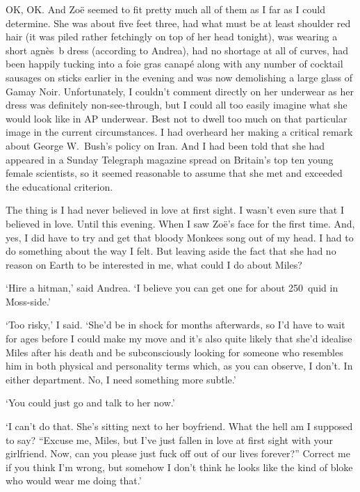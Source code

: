 OK, OK. And Zo{\"e} seemed to fit pretty much all of them as I far
as I could determine. She was about five feet three, had what must be at least shoulder red
hair (it was piled rather fetchingly on top of her head tonight), was
wearing a short agn{\`e}s~b dress (according to Andrea), had no shortage at all of curves,
had been happily tucking into a foie gras canap{\'e} along with any
number of cocktail sausages on sticks earlier in the evening and was
now demolishing a large glass of Gamay Noir. Unfortunately,
I couldn't comment directly on her underwear as her dress was
definitely non-see-through, but I could all too easily imagine what
she would look like in AP underwear. Best not to dwell too much on
that particular image in the current circumstances. I had
overheard her making a critical remark about George W.~Bush's policy
on Iran. And I had been told that she had appeared in a {\twelvesl
Sunday Telegraph\/} magazine spread on Britain's top ten young
female scientists, so it seemed reasonable to assume that she met
and exceeded the educational criterion.

The thing is I had never believed in love at first sight. I wasn't
even sure that I believed in love. Until this evening. When I saw
Zo{\"e}'s face for the first time. And, yes, I did have to try and
get that bloody Monkees song out of my head. I had to do
something about the way I felt. But leaving aside the fact that she had no reason on Earth to be
interested in me, what could I do about Miles?

`Hire a hitman,' said Andrea. `I believe you can get one for about
250~quid in Moss-side.'

`Too risky,' I said. `She'd be in shock for months afterwards, so
I'd have to wait for ages before I could make my move and it's also
quite likely that she'd idealise Miles after his death and be
subconsciously looking for someone who resembles him in both
physical and personality terms which, as you can observe, I don't. In
either department. No, I need something more subtle.'

`You could just go and talk to her now.'

`I can't do that. She's sitting next to her boyfriend.
What the hell am I supposed to say? ``Excuse me, Miles, but I've
just fallen in love at first sight with your girlfriend. Now, can
you please just fuck off out of our lives forever?'' Correct me if
you think I'm wrong, but somehow I don't think he looks like the
kind of bloke who would wear me doing that.'

